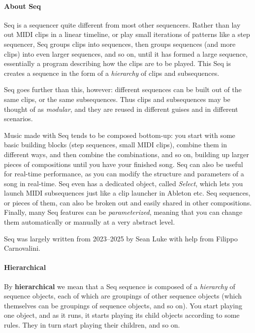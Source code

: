 \documentclass[twoside,10pt]{article}
\begin{document}
\paragraph{About Seq} 
Seq is a sequencer quite different from most other sequencers.  Rather than lay out MIDI clips in a linear timeline, or play small iterations of patterns like a step sequencer, Seq groups clips into sequences, then groups sequences (and more clips) into even larger sequences, and so on, until it has formed a large sequence, essentially a program describing how the clips are to be played.  This Seq is creates a sequence in the form of a {\it hierarchy} of clips and subsequences.

Seq goes further than this, however: different sequences can be built out of the same clips, or the same subsequences.  Thus clips and subsequences may be thought of as {\it modular}, and they are reused in different guises and in different scenarios.  

Music made with Seq tends to be composed bottom-up: you start with some basic building blocks (step sequences, small MIDI clips), combine them in different ways, and then combine the combinations, and so on, building up larger pieces of compositions until you have your finished song.  Seq can also be useful for real-time performance, as you can modify the structure and parameters of a song in real-time.  Seq even has a dedicated object, called {\it Select}, which lets you launch MIDI subsequences just like a clip launcher in Ableton etc.  Seq sequences, or pieces of them, can also be broken out and easily shared in other compositions.  Finally, many Seq features can be {\it parameterized}, meaning that you can change them automatically or manually at a very abstract level.

Seq was largely written from 2023--2025 by Sean Luke with help from Filippo Carnovalini.


\paragraph{Hierarchical}
By {\bf hierarchical} we mean that a Seq sequence is composed of a {\it hierarchy} of sequence objects, each of which are groupings of other sequence objects (which themselves can be groupings of sequence objects, and so on).  You start playing one object, and as it runs, it starts playing its child objects according to some rules.  They in turn start playing their children, and so on.
\end{document}
